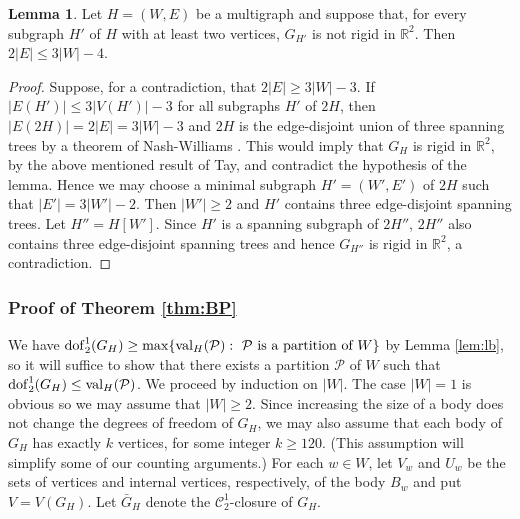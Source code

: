 \documentclass[11pt,a4paper]{article}
\theoremstyle{definition}
\newtheorem{lemma}[theorem]{Lemma}
\DeclareMathOperator{\val}{val}
\newcommand{\dof}{{\rm dof}}
\newcommand{\R}{\mathbb{R}}
\newcommand{\cC}{\mathcal{C}}
\newcommand{\cP}{\mathcal{P}}
\begin{document}
\begin{lemma}\label{lem:2dimbodies}
Let $H=(W,E)$ be a multigraph and suppose that, for every subgraph $H'$ of $H$ with at least two vertices, $G_{H'}$ is not rigid in $\R^2$. Then 
$2|E|\leq 3|W|-4$.
\end{lemma}
\begin{proof}
Suppose, for a contradiction, that $2|E|\geq 3|W|-3$.  %
If $|E(H')|\leq 3|V(H')|-3$ for all subgraphs $H'$ of $2H$, then $|E(2H)|=2|E|=3|W|-3$ and $2H$ is the edge-disjoint union of three spanning trees by a theorem of
Nash-Williams \cite{NW}.  This would imply that $G_H$ is rigid in $\R^2$,
by the above mentioned result of Tay, and
contradict the hypothesis of the lemma. Hence we may choose a minimal subgraph  $H'=(W',E')$ of $2H$ such that  $|E'| = 3|W'|-2$. Then $|W'|\geq 2$ and $H'$ contains three edge-disjoint spanning trees. Let $H''=H[W']$. Since $H'$ is a spanning subgraph of $2H''$, $2H''$ also contains three edge-disjoint spanning trees
and  hence $G_{H''}$
is rigid in $\R^2$, a contradiction.
\end{proof}





\subsubsection*{Proof of Theorem \ref{thm:BP}}
We have $\dof_2^1(G_H) \geq \max\{\val_H(\cP):\mbox{ $\cP$ is a partition of $W$}\}$
by Lemma \ref{lem:lb}, so it will suffice to 
show that there exists a partition $\cP$ of $W$ such that $\dof_2^1(G_H) \leq \val_H(\cP)$. We proceed by induction on $|W|$. The case $|W|=1$ is obvious so we may assume that $|W|\geq 2$. 
Since increasing the size of a body does not change the degrees of freedom of $G_H$,
we may also assume that each body of $G_H$ has exactly  $k$ vertices,
for some integer $k\geq 120$. 
(This assumption will simplify some of our counting arguments.)
For each $w\in W$, let $V_w$ and $U_w$ be the sets of vertices and internal vertices, respectively, of the body $B_w$ and put $V=V(G_H)$.
Let $\bar G_H$ denote the $\cC_2^1$-closure of $G_H$. 
\end{document}
